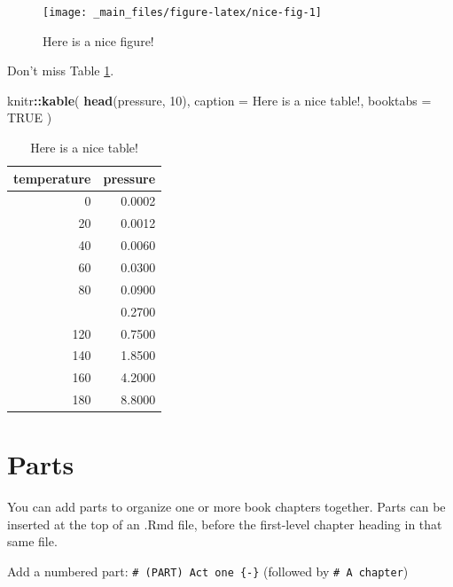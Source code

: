 \documentclass[
]{book}
\newenvironment{Shaded}{\begin{snugshade}}{\end{snugshade}}
\newcommand{\AttributeTok}[1]{\textcolor[rgb]{0.13,0.29,0.53}{#1}}
\newcommand{\ConstantTok}[1]{\textcolor[rgb]{0.56,0.35,0.01}{#1}}
\newcommand{\DecValTok}[1]{\textcolor[rgb]{0.00,0.00,0.81}{#1}}
\newcommand{\FunctionTok}[1]{\textcolor[rgb]{0.13,0.29,0.53}{\textbf{#1}}}
\newcommand{\NormalTok}[1]{#1}
\newcommand{\SpecialCharTok}[1]{\textcolor[rgb]{0.81,0.36,0.00}{\textbf{#1}}}
\newcommand{\StringTok}[1]{\textcolor[rgb]{0.31,0.60,0.02}{#1}}
\theoremstyle{definition}
\theoremstyle{definition}
\theoremstyle{definition}
\theoremstyle{definition}
\theoremstyle{remark}
\begin{document}
\begin{figure}

{\centering \texttt{[image: \_main\_files/figure-latex/nice-fig-1]} 

}

\caption{Here is a nice figure!}\label{fig:nice-fig}
\end{figure}

Don't miss Table \ref{tab:nice-tab}.

\begin{Shaded}
\begin{Highlighting}[]
\NormalTok{knitr}\SpecialCharTok{::}\FunctionTok{kable}\NormalTok{(}
  \FunctionTok{head}\NormalTok{(pressure, }\DecValTok{10}\NormalTok{), }\AttributeTok{caption =} \StringTok{\textquotesingle{}Here is a nice table!\textquotesingle{}}\NormalTok{,}
  \AttributeTok{booktabs =} \ConstantTok{TRUE}
\NormalTok{)}
\end{Highlighting}
\end{Shaded}

\begin{table}

\caption{\label{tab:nice-tab}Here is a nice table!}
\centering
\begin{tabular}[t]{rr}
\toprule
temperature & pressure\\
\midrule
0 & 0.0002\\
20 & 0.0012\\
40 & 0.0060\\
60 & 0.0300\\
80 & 0.0900\\
\addlinespace
100 & 0.2700\\
120 & 0.7500\\
140 & 1.8500\\
160 & 4.2000\\
180 & 8.8000\\
\bottomrule
\end{tabular}
\end{table}

\chapter{Parts}\label{parts}

You can add parts to organize one or more book chapters together. Parts can be inserted at the top of an .Rmd file, before the first-level chapter heading in that same file.

Add a numbered part: \texttt{\#\ (PART)\ Act\ one\ \{-\}} (followed by \texttt{\#\ A\ chapter})
\end{document}
